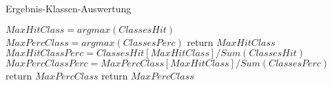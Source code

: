     \begin{algorithm}
        \caption{Ergebnis-Klassen-Auswertung}
        \begin{algorithmic}[1]
            \State {}
            \State
            \State $MaxHitClass = argmax(ClassesHit)$
            \State $MaxPercClass = argmax(ClassesPerc)$
            \State
                \State return $MaxHitClass$
            \Else
                \State
                \State $MaxHitClassPerc = ClassesHit[MaxHitClass] / Sum(ClassesHit) $
                \State $MaxPercClassPerc = MaxPercClass[MaxHitClass] / Sum(ClassesPerc) $
                \State
                    \State return $MaxPercClass$
                \Else
                    \State return $MaxPercClass$
                \EndIf
            \EndIf
        \EndFunction
        \end{algorithmic}
    \end{algorithm}